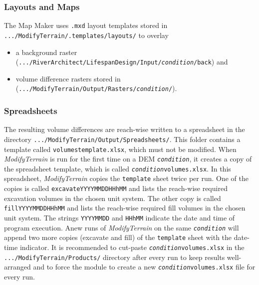 \subsubsection{Layouts and Maps} \label{sec:mtoutmaps}
The Map Maker uses \texttt{.mxd} layout templates stored in \texttt{.../ModifyTerrain/.templates/layouts/} to overlay
\begin{itemize}
	\item a background raster (\texttt{.../RiverArchitect/LifespanDesign/Input/\textit{condition}/back}) and 
	\item volume difference rasters stored in (\texttt{.../ModifyTerrain/Output/Rasters/\textit{condition}/}).
\end{itemize}

\subsubsection{Spreadsheets} \label{sec:mtoutspread}
The resulting volume differences are reach-wise written to a spreadsheet in the directory \texttt{.../ModifyTerrain/Output/Spreadsheets/}. This folder contains a template called \texttt{volumes{\myUnderscore}template.xlsx}, which must not be modified. When \textit{ModifyTerrain} is run for the first time on a DEM \texttt{\textit{condition}}, it creates a copy of the spreadsheet template, which is called \texttt{\textit{condition}{\myUnderscore}volumes.xlsx}. In this spreadsheet, \textit{ModifyTerrain} copies the \texttt{template} sheet twice per run. One of the copies is called \texttt{excavate{\myUnderscore}YYYYMMDD{\myUnderscore}HHhMM} and lists the reach-wise required excavation volumes in the chosen unit system. The other copy is called \texttt{fill{\myUnderscore}YYYYMMDD{\myUnderscore}HHhMM} and lists the reach-wise required fill volumes in the chosen unit system. The strings \texttt{YYYYMMDD} and \texttt{HHhMM} indicate the date and time of program execution. Anew runs of \textit{ModifyTerrain} on the same \texttt{\textit{condition}} will append two more copies (excavate and fill) of the \texttt{template} sheet with the date-time indicator. It is recommended to cut-paste \texttt{\textit{condition}{\myUnderscore}volumes.xlsx} in the \texttt{.../ModifyTerrain/Products/} directory after every run to keep results well-arranged and to force the module to create a new \texttt{\textit{condition}{\myUnderscore}volumes.xlsx} file for every run.

